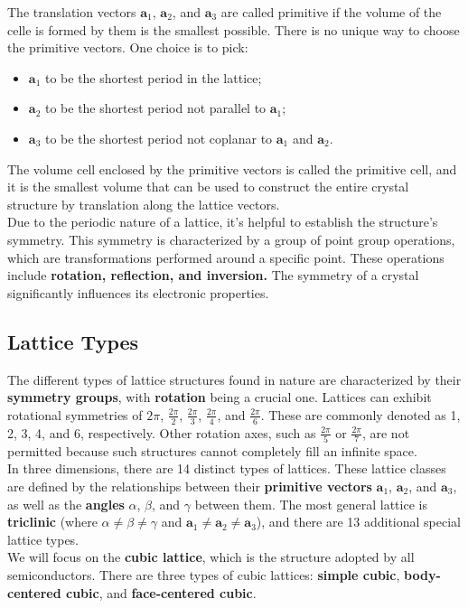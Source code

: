 The translation vectors $\mathbf{a}_1$, $\mathbf{a}_2$, and $\mathbf{a}_3$ are called primitive if the volume of the celle is formed by them is the smallest possible. There is no unique way to choose the primitive vectors. One choice is to pick:
\begin{itemize}
	\item $\mathbf{a}_1$ to be the shortest period in the lattice;
	\item $\mathbf{a}_2$ to be the shortest period not parallel to $\mathbf{a}_1$;
	\item $\mathbf{a}_3$ to be the shortest period not coplanar to $\mathbf{a}_1$ and $\mathbf{a}_2$.
\end{itemize}
The volume cell enclosed by the primitive vectors is called the primitive cell, and it is the smallest volume that can be used to construct the entire crystal structure by translation along the lattice vectors.\\
Due to the periodic nature of a lattice, it's helpful to establish the structure's symmetry. This symmetry is characterized by a group of point group operations, which are transformations performed around a specific point. These operations include \textbf{rotation, reflection, and inversion.}
The symmetry of a crystal significantly influences its electronic properties.

\subsection{Lattice Types}
The different types of lattice structures found in nature are characterized by their \textbf{symmetry groups}, with \textbf{rotation} being a crucial one. Lattices can exhibit rotational symmetries of $2\pi$, $\frac{2\pi}{2}$, $\frac{2\pi}{3}$, $\frac{2\pi}{4}$, and $\frac{2\pi}{6}$. These are commonly denoted as 1, 2, 3, 4, and 6, respectively. Other rotation axes, such as $\frac{2\pi}{5}$ or $\frac{2\pi}{7}$, are not permitted because such structures cannot completely fill an infinite space.\\
In three dimensions, there are 14 distinct types of lattices. These lattice classes are defined by the relationships between their \textbf{primitive vectors} $\mathbf{a}_1$, $\mathbf{a}_2$, and $\mathbf{a}_3$, as well as the \textbf{angles} $\alpha$, $\beta$, and $\gamma$ between them. The most general lattice is \textbf{triclinic} (where $\alpha \neq \beta \neq \gamma$ and $\mathbf{a}_1 \neq \mathbf{a}_2 \neq \mathbf{a}_3$), and there are 13 additional special lattice types.\\
We will focus on the \textbf{cubic lattice}, which is the structure adopted by all semiconductors. There are three types of cubic lattices: \textbf{simple cubic}, \textbf{body-centered cubic}, and \textbf{face-centered cubic}.\\

